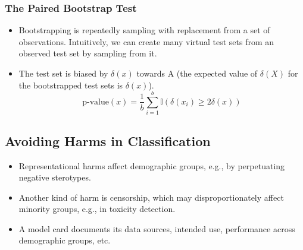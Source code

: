 \subsubsection{The Paired Bootstrap Test}

\begin{itemize}
      \item Bootstrapping is repeatedly sampling with replacement from a set of observations.
            Intuitively, we can create many virtual test sets from an observed test set by sampling from it.
      \item The test set is biased by $\delta(x)$ towards A (the expected value of $\delta(X)$ for the bootstrapped test sets is $\delta(x)$).
            \begin{equation}
                  \text{p-value}(x) = \frac{1}{b} \sum_{i = 1}^{b} \mathbb{I}(\delta(x_i) \geq 2 \delta(x))
            \end{equation}
\end{itemize}

\subsection{Avoiding Harms in Classification}

\begin{itemize}
      \item Representational harms affect demographic groups, e.g., by perpetuating negative sterotypes.
      \item Another kind of harm is censorship, which may disproportionately affect minority groups, e.g., in toxicity detection.
      \item A model card documents its data sources, intended use, performance across demographic groups, etc.
\end{itemize}
